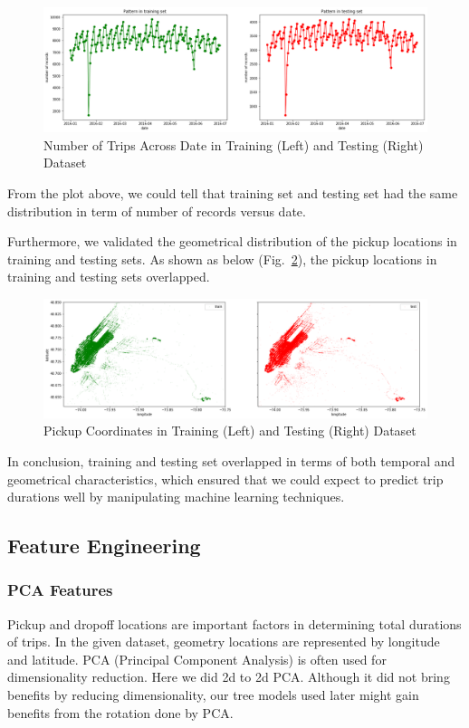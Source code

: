 \begin{figure}[!htbp]
	\centering
	\includegraphics[width=\linewidth]{eda2.png}
	\caption{Number of Trips Across Date in Training (Left) and Testing (Right) Dataset}
	\label{fig:eda2}
\end{figure}

From the plot above, we could tell that training set and testing set had the same distribution in term of number of records versus date. 

Furthermore, we validated the geometrical distribution of the pickup locations in training and testing sets. As shown as below (Fig.~\ref{fig:eda3}), the pickup locations in training and testing sets overlapped. 

\begin{figure}[!htbp]
	\centering
	\includegraphics[width=\linewidth]{eda3.png}
	\caption{Pickup Coordinates in Training (Left) and Testing (Right) Dataset}
	\label{fig:eda3}
\end{figure}

In conclusion, training and testing set overlapped in terms of both temporal and geometrical characteristics, which ensured that we could expect to predict trip durations well by manipulating machine learning techniques. 

\subsection{Feature Engineering}

\subsubsection{PCA Features}
Pickup and dropoff locations are important factors in determining total durations of trips. In the given dataset, geometry locations are represented by longitude and latitude. PCA (Principal Component Analysis) is often used for dimensionality reduction. Here we did 2d to 2d PCA. Although it did not bring benefits by reducing dimensionality, our tree models used later might gain benefits from the rotation done by PCA.

